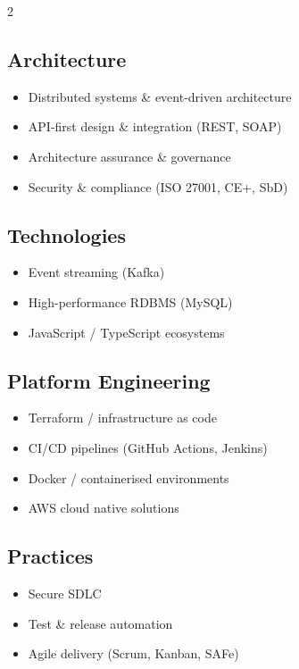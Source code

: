 \documentclass{cv}
\begin{document}
\begin{multicols}{2}
\subsection{Architecture}
\begin{itemize}
\item Distributed systems \& event-driven architecture
\item API-first design \& integration (REST, SOAP)
\item Architecture assurance \& governance
\item Security \& compliance (ISO 27001, CE+, SbD)
\end{itemize}

\subsection{Technologies}
\begin{itemize}
\item Event streaming (Kafka)
\item High-performance RDBMS (MySQL)
\item JavaScript / TypeScript ecosystems
\end{itemize}

\subsection{Platform Engineering}
\begin{itemize}
\item Terraform / infrastructure as code
\item CI/CD pipelines (GitHub Actions, Jenkins)
\item Docker / containerised environments
\item AWS cloud native solutions
\end{itemize}

\subsection{Practices}
\begin{itemize}
\item Secure SDLC
\item Test \& release automation
\item Agile delivery (Scrum, Kanban, SAFe)
\end{itemize}
\end{multicols}

\end{document}
